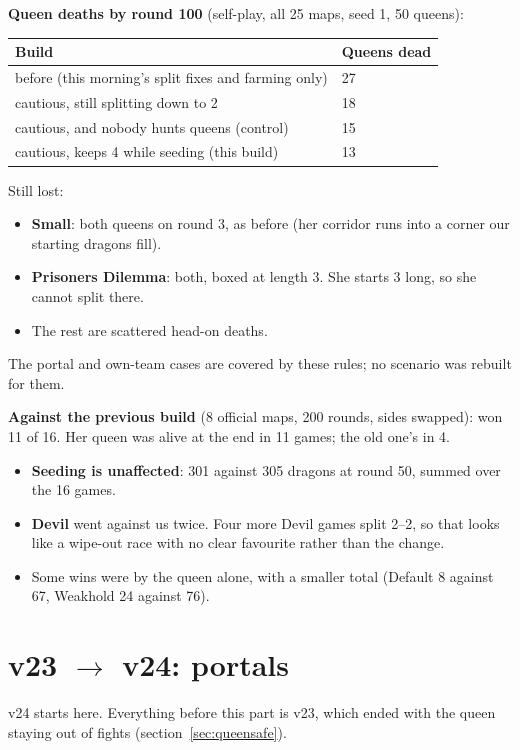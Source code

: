 \documentclass[11pt,a4paper]{article}
\begin{document}
\textbf{Queen deaths by round 100} (self-play, all 25 maps, seed 1, 50 queens):
\begin{center}
\begin{tabular}{@{}ll@{}}
\toprule
Build & Queens dead \\
\midrule
before (this morning's split fixes and farming only) & 27 \\
cautious, still splitting down to 2 & 18 \\
cautious, and nobody hunts queens (control) & 15 \\
cautious, keeps 4 while seeding (this build) & 13 \\
\bottomrule
\end{tabular}
\end{center}
Still lost:
\begin{itemize}
  \item \textbf{Small}: both queens on round 3, as before (her corridor runs into a corner our starting dragons fill).
  \item \textbf{Prisoners Dilemma}: both, boxed at length 3. She starts 3 long, so she cannot split there.
  \item The rest are scattered head-on deaths.
\end{itemize}
The portal and own-team cases are covered by these rules; no scenario was rebuilt for them.

\textbf{Against the previous build} (8 official maps, 200 rounds, sides swapped): won 11 of 16. Her queen was alive at the end in 11
games; the old one's in 4.
\begin{itemize}
  \item \textbf{Seeding is unaffected}: 301 against 305 dragons at round 50, summed over the 16 games.
  \item \textbf{Devil} went against us twice. Four more Devil games split 2--2, so that looks like a wipe-out race with no clear
        favourite rather than the change.
  \item Some wins were by the queen alone, with a smaller total (Default 8 against 67, Weakhold 24 against 76).
\end{itemize}



\part{v23 $\rightarrow$ v24: portals}
v24 starts here. Everything before this part is v23, which ended with the queen staying out of fights
(section~\ref{sec:queensafe}).
\end{document}
